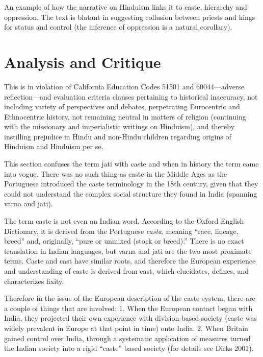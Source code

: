 An example of how the narrative on Hinduism links it to caste, hierarchy and oppression. The text is blatant in suggesting collusion between priests and kings for status and control (the inference of oppression is a natural corollary).

\begin{longtable}{|>{\raggedleft}p{1.5cm}|p{8.5cm}|}
\multicolumn{2}{|c|{\textbf{Table: 3}} 
\hline
\multicolumn{1}{|l|}{\textbf{Page #}} & \multicolumn{1}{|l|}{\textbf{McGraw Hill Text}} \tabularnewline
\hline
258 & Scholars refer to the jati system as a caste (KAST) system. In such a system, people remain in the same social group&nbsp;for life. \tabularnewline
\hline
\end{longtable}

\section*{Analysis and Critique} 

This is in violation of California Education Codes 51501 and 60044—adverse reflection—and evaluation criteria clauses pertaining to historical inaccuracy, not including variety of perspectives and debates, perpetrating Eurocentric and Ethnocentric history, not remaining neutral in matters of religion (continuing with the missionary and imperialistic writings on Hinduism), and thereby instilling prejudice in Hindu and non-Hindu children regarding origins of Hinduism and Hinduism per se.

This section confuses the term jati with caste and when in history the term came into vogue. There was no such thing as caste in the Middle Ages as the Portuguese introduced the caste terminology in the 18th century, given that they could not understand the complex social structure they found in India (spanning varna and jati).

The term caste is not even an Indian word. According to the Oxford English Dictionary, it is derived from the Portuguese \textit{casta},  meaning “race, lineage, breed” and, originally, “pure or unmixed (stock or breed).” There is no exact translation in Indian languages, but varna and jati are the two most proximate terms. Caste and cast have similar roots, and therefore the European experience and understanding of caste is derived from cast, which elucidates, defines, and characterizes fixity. 

Therefore in the issue of the European description of the caste system, there are a couple of things that are involved: 1. When the European contact began with India, they projected their own experience with division-based society (caste was widely prevalent in Europe at that point in time) onto India. 2. When Britain gained control over India, through a systematic application of measures turned the Indian society into a rigid “caste” based society (for details see Dirks 2001).


